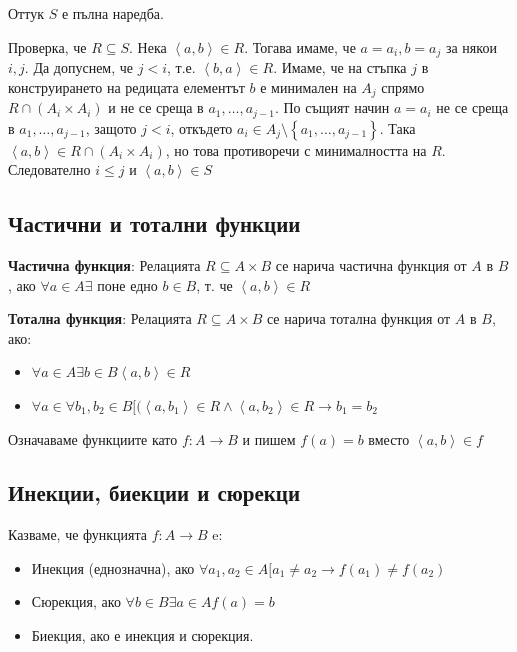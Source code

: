 \documentclass{article}
\renewcommand{\\}{\newline}
\begin{document}
    Оттук \(S\) е пълна наредба.

    Проверка, че \(R \subseteq S\). Нека \(\left\langle a, b\right\rangle\in R\). Тогава имаме, че \(a = a_i, b = a_j\) за някои \(i, j\). Да допуснем, че \(j < i\), т.е. \(\left\langle b, a\right\rangle \in R\). Имаме, че на стъпка \(j\) в конструирането на редицата елементът \(b\) е минимален на \(A_j\) спрямо \(R \cap (A_i\times A_i)\) и не се среща в \(a_1,\dots,a_{j-1}\). По същият начин \(a = a_i\) не се среща в \(a_1,\dots,a_{j-1}\), защото \(j < i\), откъдето \(a_i \in A_j\setminus \left\{a_1,\dots,a_{j-1}\right\}\). 
    Така \(\left\langle a, b\right\rangle \in R \cap (A_i \times A_i)\), но това противоречи с минималността на \(R\). Следователно \(i \leq j\) и \(\left\langle a, b\right\rangle \in S\)     

    \subsection{Частични и тотални функции }
    \textbf{Частична функция}: Релацията \(R \subseteq A \times B\) се нарича частична функция от \(A\) в \(B\), ако \(\forall a \in A \exists\) поне едно \(b \in B\), т. че \(\left\langle a, b\right\rangle \in R\)    

    \textbf{Тотална функция}: Релацията \(R \subseteq A \times B\) се нарича тотална функция от \(A\) в \(B\), ако:
      \begin{itemize}
          \item \(\forall a \in A \exists b \in B \left\langle a, b\right\rangle \in R\) 
          \item \(\forall a \in \forall b_1, b_2 \in B [(\left\langle a, b_1\right\rangle \in R \land \left\langle a, b_2\right\rangle \in R \rightarrow b_1 = b_2\)  
      \end{itemize}

    Означаваме функциите като \(f: A \to B\) и пишем \(f(a) = b\) вместо \(\left\langle a, b\right\rangle \in f\)    

    \subsection{Инекции, биекции и сюрекци }
    Казваме, че функцията \(f: A \to B\) e:
    \begin{itemize}
        \item Инекция (еднозначна), ако \(\forall a_1, a_2 \in A [a_1 \not= a_2 \rightarrow f(a_1) \not= f(a_2)\)  
        \item Сюрекция, ако \(\forall b \in B \exists a \in A f(a) = b\)  
        \item Биекция, ако е инекция и сюрекция.
    \end{itemize}
\end{document}
